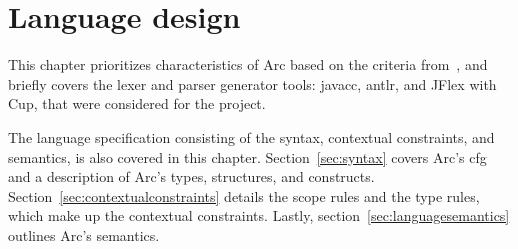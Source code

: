 \chapter{Language design}\label{cha:languagedesign}
This chapter prioritizes characteristics of Arc based on the criteria from~\cite{Sebesta2016}, and briefly covers the lexer and parser generator tools: \gls{javacc}, \gls{antlr}, and JFlex with Cup, that were considered for the project.

The language specification consisting of the syntax, contextual constraints, and semantics, is also covered in this chapter. Section~\ref{sec:syntax} covers Arc's \gls{cfg} and a description of Arc's types, structures, and constructs. Section~\ref{sec:contextualconstraints} details the scope rules and the type rules, which make up the contextual constraints. Lastly, section~\ref{sec:languagesemantics} outlines Arc's semantics.






